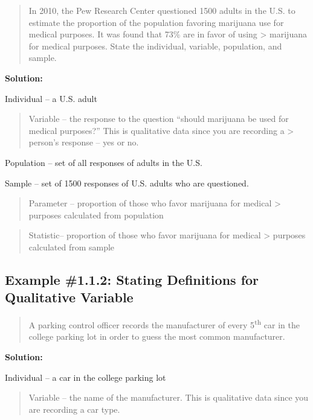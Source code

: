 \documentclass[]{book}
\begin{document}
\begin{quote}
In 2010, the Pew Research Center questioned 1500 adults in the U.S. to estimate the proportion of the population favoring marijuana use for medical purposes. It was found that 73\% are in favor of using \textgreater{} marijuana for medical purposes. State the individual, variable, population, and sample.
\end{quote}

\textbf{Solution:}

Individual -- a U.S. adult

\begin{quote}
Variable -- the response to the question ``should marijuana be used for medical purposes?'' This is qualitative data since you are recording a \textgreater{} person's response -- yes or no.
\end{quote}

Population -- set of all responses of adults in the U.S.

Sample -- set of 1500 responses of U.S. adults who are questioned.

\begin{quote}
Parameter -- proportion of those who favor marijuana for medical \textgreater{} purposes calculated from population
\end{quote}

\begin{quote}
Statistic-- proportion of those who favor marijuana for medical \textgreater{} purposes calculated from sample
\end{quote}

\hypertarget{example-1.1.2-stating-definitions-for-qualitative-variable}{%
\subsection{Example \#1.1.2: Stating Definitions for Qualitative Variable}\label{example-1.1.2-stating-definitions-for-qualitative-variable}}

\begin{quote}
A parking control officer records the manufacturer of every 5\textsuperscript{th} car in the college parking lot in order to guess the most common manufacturer.
\end{quote}

\textbf{Solution:}

Individual -- a car in the college parking lot

\begin{quote}
Variable -- the name of the manufacturer. This is qualitative data since you are recording a car type.
\end{quote}
\end{document}
